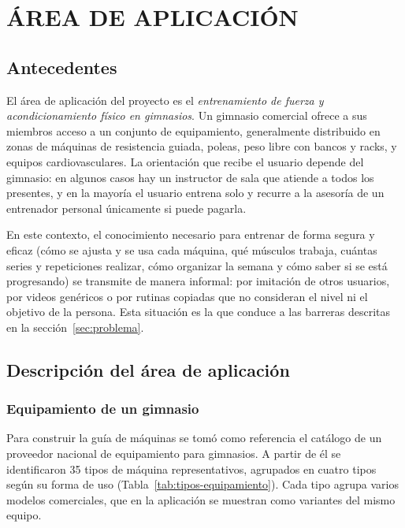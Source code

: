\chapter{ÁREA DE APLICACIÓN}
\label{cap:area-aplicacion}

\section{Antecedentes}
\label{sec:aa-antecedentes}

El área de aplicación del proyecto es el \emph{entrenamiento de fuerza y
acondicionamiento físico en gimnasios}. Un gimnasio comercial ofrece a sus
miembros acceso a un conjunto de equipamiento, generalmente distribuido en
zonas de máquinas de resistencia guiada, poleas, peso libre con bancos y
racks, y equipos cardiovasculares. La orientación que recibe el usuario
depende del gimnasio: en algunos casos hay un instructor de sala que atiende a
todos los presentes, y en la mayoría el usuario entrena solo y recurre a la
asesoría de un entrenador personal únicamente si puede pagarla.

En este contexto, el conocimiento necesario para entrenar de forma segura y
eficaz (cómo se ajusta y se usa cada máquina, qué músculos trabaja, cuántas
series y repeticiones realizar, cómo organizar la semana y cómo saber si se
está progresando) se transmite de manera informal: por imitación de otros
usuarios, por videos genéricos o por rutinas copiadas que no consideran el
nivel ni el objetivo de la persona. Esta situación es la que conduce a las
barreras descritas en la sección~\ref{sec:problema}.

\section{Descripción del área de aplicación}
\label{sec:aa-descripcion}

\subsection{Equipamiento de un gimnasio}

Para construir la guía de máquinas se tomó como referencia el catálogo de un
proveedor nacional de equipamiento para gimnasios. A partir de él se
identificaron 35 tipos de máquina representativos, agrupados en cuatro tipos
según su forma de uso (Tabla~\ref{tab:tipos-equipamiento}). Cada tipo agrupa
varios modelos comerciales, que en la aplicación se muestran como variantes
del mismo equipo.

